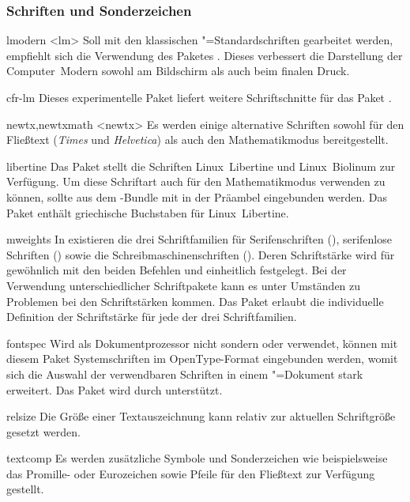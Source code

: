 \subsubsection{Schriften und Sonderzeichen}
\begin{packages}
\item[lmodern]<lm>
  Soll mit den klassischen "=Standardschriften gearbeitet werden, 
  empfiehlt sich die Verwendung des Paketes . Dieses 
  verbessert die Darstellung der Computer~Modern sowohl am Bildschirm als auch 
  beim finalen Druck.
\item[cfr-lm]
  Dieses experimentelle Paket liefert weitere Schriftschnitte für das Paket 
  .
\item[newtx,newtxmath]<newtx>
  Es werden einige alternative Schriften sowohl für den Fließtext 
  (\textit{Times} und \textit{Helvetica}) als auch den Mathematikmodus 
  bereitgestellt.
\item[libertine]
  Das Paket stellt die Schriften Linux~Libertine und Linux~Biolinum zur 
  Verfügung. Um diese Schriftart auch für den Mathematikmodus verwenden zu 
  können, sollte  aus dem -Bundle mit     
   in der 
  Präambel eingebunden werden. Das Paket  enthält griechische 
  Buchstaben für Linux~Libertine.
\item[mweights]
  In  existieren die drei Schriftfamilien für Serifenschriften 
  (), serifenlose Schriften () sowie die 
  Schreibmaschinenschriften (). Deren Schriftstärke wird für 
  gewöhnlich mit den beiden Befehlen  und  
  einheitlich festgelegt. Bei der Verwendung unterschiedlicher Schriftpakete 
  kann es unter Umständen zu Problemen bei den Schriftstärken kommen. Das Paket 
   erlaubt die individuelle Definition der Schriftstärke für 
  jede der drei Schriftfamilien.
\item[fontspec]
  Wird als Dokumentprozessor nicht  sondern  
  oder  verwendet, können mit diesem Paket Systemschriften im 
  OpenType-Format eingebunden werden, womit sich die Auswahl der verwendbaren 
  Schriften in einem "=Dokument stark erweitert. Das Paket wird 
  durch \TUDScript unterstützt.
\item[relsize]
  Die Größe einer Textauszeichnung kann relativ zur aktuellen Schriftgröße 
  gesetzt werden.
\item[textcomp]
  Es werden zusätzliche Symbole und Sonderzeichen wie beispielsweise das 
  Promille- oder Eurozeichen sowie Pfeile für den Fließtext zur Verfügung 
  gestellt.
\end{packages}
